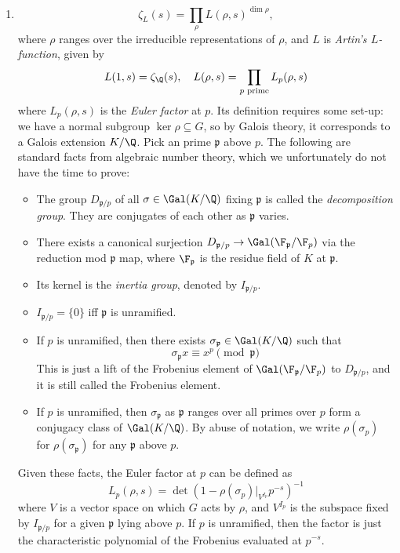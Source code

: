 \documentclass[a4paper]{article}
\begin{document}
\begin{enumerate}
  \item
    \[
      \zeta_L(s) = \prod_{\rho} L(\rho, s)^{\dim \rho},
    \]
    where $\rho$ ranges over the irreducible representations of $\rho$, and $L$ is \emph{Artin's $L$-function}, given by
 \[
 L(1, s) = \zeta_\Q(s),\quad L(\rho, s) = \prod_{p\text{ prime}}L_p(\rho,s)
 \]
 where $L_p(\rho,s)$ is the \emph{Euler factor} at $p$. Its definition requires some set-up: we have a normal subgroup $\ker\rho\subseteq G$, so by Galois theory, it corresponds to a Galois extension $K/\Q$. Pick an prime $\mathfrak{p}$ above $p$. The following are standard facts from algebraic number theory, which we unfortunately do not have the time to prove:
 \begin{itemize}
   \item The group $D_{\mathfrak{p}/p}$ of all $\sigma\in\Gal(K/\Q)$ fixing $\mathfrak{p}$ is called the \emph{decomposition group}. They are conjugates of each other as $\mathfrak{p}$ varies.
   \item There exists a canonical surjection $D_{\mathfrak{p}/p}\to\Gal(\F_\mathfrak{p}/\F_p)$ via the reduction mod $\mathfrak{p}$ map, where $\F_\mathfrak{p}$ is the residue field of $K$ at $\mathfrak{p}$.
   \item Its kernel is the \emph{inertia group}, denoted by $I_{\mathfrak{p}/p}$.
   \item $I_{\mathfrak{p}/p}=\{0\}$ iff $\mathfrak{p}$ is unramified.
   \item If $p$ is unramified, then there exists $\sigma_{\mathfrak{p}}\in\Gal(K/\Q)$ such that
   \[
     \sigma_{\mathfrak{p}}x\equiv x^p\pmod{\mathfrak{p}}
   \]
   This is just a lift of the Frobenius element of $\Gal(\F_\mathfrak{p}/\F_p)$ to $D_{\mathfrak{p}/p}$, and it is still called the Frobenius element.
   \item If $p$ is unramified, then $\sigma_{\mathfrak{p}}$ as $\mathfrak{p}$ ranges over all primes over $p$ form a conjugacy class of $\Gal(K/\Q)$. By abuse of notation, we write $\rho(\sigma_p)$ for $\rho(\sigma_\mathfrak{p})$ for any $\mathfrak{p}$ above $p$.
 \end{itemize}
 Given these facts, the Euler factor at $p$ can be defined as
 \[
   L_p(\rho,s)=\det(1-\rho(\sigma_p)|_{V^{I_p}}p^{-s})^{-1}
 \]
 where $V$ is a vector space on which $G$ acts by $\rho$, and $V^{I_p}$ is the subspace fixed by $I_{\mathfrak{p}/p}$ for a given $\mathfrak{p}$ lying above $p$. If $p$ is unramified, then the factor is just the characteristic polynomial of the Frobenius evaluated at $p^{-s}$.


\end{enumerate}
\end{document}
